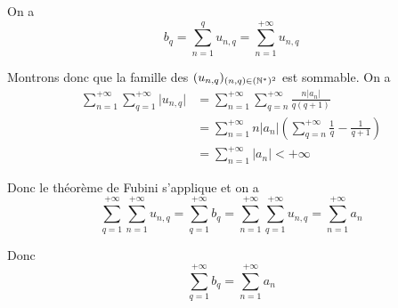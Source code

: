 \begin{solution}
	On a 
	$$b_{q}=\sum_{n=1}^{q}u_{n,q}=\sum_{n=1}^{+\infty}u_{n,q}$$

	Montrons donc que la famille des $(u_{n,q})_{(n,q)\in(\mathbb{N}^{*})^{2}}$ est sommable. On a 
	\begin{align*}
		\sum_{n=1}^{+\infty}\sum_{q=1}^{+\infty}\vert u_{n,q}\vert
		&=\sum_{n=1}^{+\infty}\sum_{q=n}^{+\infty}\frac{n\vert a_{n}\vert}{q(q+1)}\\
		&=\sum_{n=1}^{+\infty}n\vert a_{n}\vert\left(\sum_{q=n}^{+\infty}\frac{1}{q}-\frac{1}{q+1}\right)\\
		&=\sum_{n=1}^{+\infty}\vert a_{n}\vert<+\infty
	\end{align*}

	Donc le théorème de Fubini s'applique et on a 
	$$\sum_{q=1}^{+\infty}\sum_{n=1}^{+\infty}u_{n,q}=\sum_{q=1}^{+\infty}b_{q}=\sum_{n=1}^{+\infty}\sum_{q=1}^{+\infty}u_{n,q}=\sum_{n=1}^{+\infty}a_{n}$$

	Donc 
	$$\boxed{\sum_{q=1}^{+\infty}b_{q}=\sum_{n=1}^{+\infty}a_{n}}$$
\end{solution}

